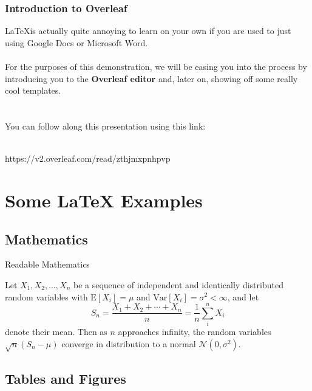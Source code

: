 \documentclass[10pt,xcolor={table,dvipsnames},t]{beamer}
\begin{document}
\begin{frame}
\frametitle{Introduction to Overleaf}
\LaTeX is actually quite annoying to learn on your own if you are used to just using Google Docs or Microsoft Word.\\~\\

For the purposes of this demonstration, we will be easing you into the process by introducing you to the \textbf{Overleaf editor} and, later on, showing off some really cool templates. \\\\\\
You can follow along this presentation using this link:\\\\
\begin{center}
https://v2.overleaf.com/read/zthjmxpnhpvp
\end{center}
\end{frame}
 
\section{Some \LaTeX{} Examples}

\subsection{Mathematics}

\begin{frame}{Readable Mathematics}

Let $X_1, X_2, \ldots, X_n$ be a sequence of independent and identically distributed random variables with $\text{E}[X_i] = \mu$ and $\text{Var}[X_i] = \sigma^2 < \infty$, and let
$$S_n = \frac{X_1 + X_2 + \cdots + X_n}{n}
      = \frac{1}{n}\sum_{i}^{n} X_i$$
denote their mean. Then as $n$ approaches infinity, the random variables $\sqrt{n}(S_n - \mu)$ converge in distribution to a normal $\mathcal{N}(0, \sigma^2)$.

\end{frame}


\subsection{Tables and Figures}

\smallframetitle
\end{document}
